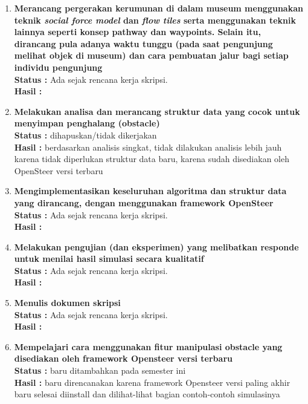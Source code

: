 \documentclass[a4paper,twoside]{article}
\begin{document}
\begin{enumerate}
		\item \textbf{Merancang pergerakan kerumunan di dalam museum menggunakan teknik {\it social force model} dan {\it flow tiles} serta menggunakan teknik lainnya seperti konsep pathway dan waypoints. Selain itu, dirancang pula adanya waktu tunggu (pada saat pengunjung melihat objek di museum) dan cara pembuatan jalur bagi setiap individu pengunjung}\\
		{\bf Status :} Ada sejak rencana kerja skripsi.\\
		{\bf Hasil :}

		\item \textbf{Melakukan analisa dan merancang struktur data yang cocok untuk menyimpan penghalang (obstacle)}\\
		{\bf Status :} dihapuskan/tidak dikerjakan \\
		{\bf Hasil :} berdasarkan analisis singkat, tidak dilakukan analisis lebih jauh karena tidak diperlukan struktur data baru, karena sudah disediakan oleh OpenSteer versi terbaru

		\item \textbf{Mengimplementasikan keseluruhan algoritma dan struktur data yang dirancang, dengan menggunakan framework OpenSteer} \\
		{\bf Status :} Ada sejak rencana kerja skripsi.\\
		{\bf Hasil :}

		\item \textbf{Melakukan pengujian (dan eksperimen) yang melibatkan responde untuk menilai hasil simulasi secara kualitatif}\\
		{\bf Status :} Ada sejak rencana kerja skripsi.\\
		{\bf Hasil :}

		\item \textbf{Menulis dokumen skripsi}\\
		{\bf Status :} Ada sejak rencana kerja skripsi.\\
		{\bf Hasil :} \lipsum[1]
		
		\item \textbf{Mempelajari cara menggunakan fitur manipulasi obstacle yang disediakan oleh framework Opensteer versi terbaru}\\
		{\bf Status :} baru ditambahkan pada semester ini\\
		{\bf Hasil :} baru direncanakan karena framework Opensteer versi paling akhir baru selesai diinstall dan dilihat-lihat bagian contoh-contoh simulasinya
		

	\end{enumerate}
\end{document}
